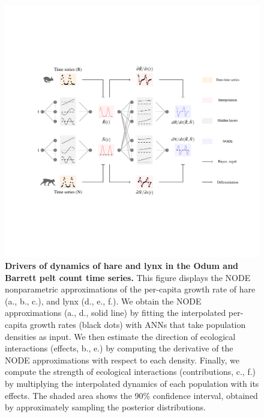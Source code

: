 \documentclass[11pt, oneside]{article}
\begin{document}
\newpage
\begin{figure}[H]
\begin{center}
\includegraphics[width=\linewidth,page=7]{figures/main.pdf}
\caption{
    \textbf{Drivers of dynamics of hare and lynx in the Odum and Barrett pelt count time series.}
    This figure displays the NODE nonparametric approximations of the per-capita growth rate of hare (a., b., c.), and lynx (d., e., f.).
    We obtain the NODE approximations (a., d., solid line) by fitting the interpolated per-capita growth rates (black dots) with ANNs that take population densities as input.
    We then estimate the direction of ecological interactions (effects, b., e.) by computing the derivative of the NODE approximations with respect to each density.
    Finally, we compute the strength of ecological interactions (contributions, c., f.) by multiplying the interpolated dynamics of each population with its effects.
    The shaded area shows the 90\% confidence interval, obtained by approximately sampling the posterior distributions. 
}
\end{center}
\end{figure}
\newpage
\end{document}
